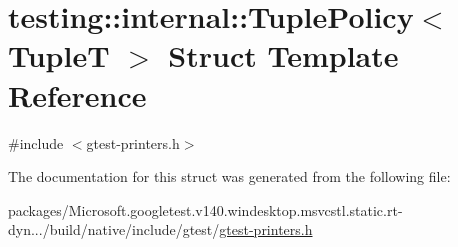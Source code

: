 \hypertarget{structtesting_1_1internal_1_1_tuple_policy}{}\section{testing\+::internal\+::Tuple\+Policy$<$ TupleT $>$ Struct Template Reference}
\label{structtesting_1_1internal_1_1_tuple_policy}


{\ttfamily \#include $<$gtest-\/printers.\+h$>$}



The documentation for this struct was generated from the following file\+:\begin{DoxyCompactItemize}
\item 
packages/\+Microsoft.\+googletest.\+v140.\+windesktop.\+msvcstl.\+static.\+rt-\/dyn.../build/native/include/gtest/\mbox{\hyperlink{gtest-printers_8h}{gtest-\/printers.\+h}}\end{DoxyCompactItemize}
